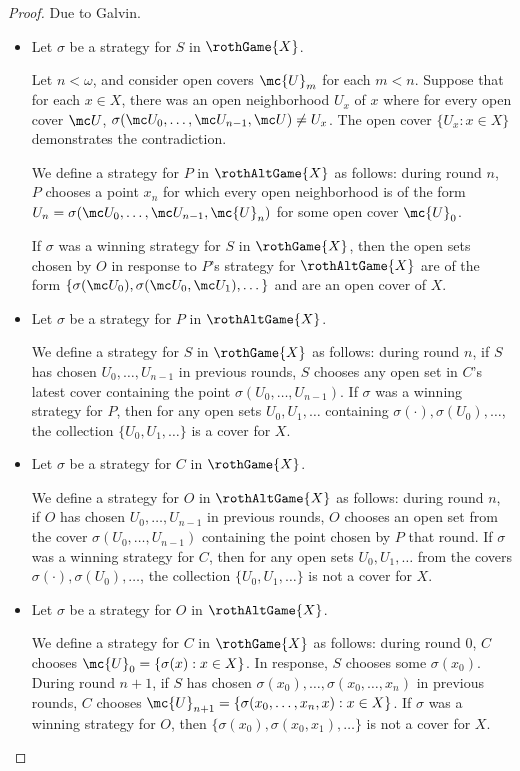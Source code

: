   \begin{proof}
    Due to Galvin.

    \begin{itemize}
      \item
      Let $\sigma$ be a strategy for $S$ in $\rothGame{X}$.

      Let $n<\omega$, and consider open covers $\mc{U}_m$ for each $m<n$. Suppose that for each $x\in X$, there was an open neighborhood $U_x$ of $x$ where for every open cover $\mc U$, $\sigma(\mc U_0,\dots,\mc U_{n-1},\mc U)\not=U_x$. The open cover $\{U_x : x\in X\}$ demonstrates the contradiction.

      We define a strategy for $P$ in $\rothAltGame{X}$ as follows: during round $n$, $P$ chooses a point $x_n$ for which every open neighborhood is of the form $U_n = \sigma(\mc U_0,\dots,\mc U_{n-1},\mc{U}_n)$ for some open cover $\mc{U}_0$.

      If $\sigma$ was a winning strategy for $S$ in $\rothGame{X}$, then the open sets chosen by $O$ in response to $P$'s strategy for $\rothAltGame{X}$ are of the form $\{\sigma(\mc U_0),\sigma(\mc U_0,\mc U_1),\dots\}$ and are an open cover of $X$.

      \item
      Let $\sigma$ be a strategy for $P$ in $\rothAltGame{X}$.

      We define a strategy for $S$ in $\rothGame{X}$ as follows: during round $n$, if $S$ has chosen $U_0,\dots,U_{n-1}$ in previous rounds, $S$ chooses any open set in $C$'s latest cover containing the point $\sigma(U_0,\dots,U_{n-1})$. If $\sigma$ was a winning strategy for $P$, then for any open sets $U_0,U_1,\dots$ containing $\sigma(\cdot),\sigma(U_0),\dots$, the collection $\{U_0,U_1,\dots\}$ is a cover for $X$.

      \item
      Let $\sigma$ be a strategy for $C$ in $\rothGame{X}$.

      We define a strategy for $O$ in $\rothAltGame{X}$ as follows: during round $n$, if $O$ has chosen $U_0,\dots,U_{n-1}$ in previous rounds, $O$ chooses an open set from the cover $\sigma(U_0,\dots,U_{n-1})$ containing the point chosen by $P$ that round. If $\sigma$ was a winning strategy for $C$, then for any open sets $U_0,U_1,\dots$ from the covers $\sigma(\cdot),\sigma(U_0),\dots$, the collection $\{U_0,U_1,\dots\}$ is not a cover for $X$.

      \item
      Let $\sigma$ be a strategy for $O$ in $\rothAltGame{X}$.

      We define a strategy for $C$ in $\rothGame{X}$ as follows: during round $0$, $C$ chooses $\mc{U}_0 = \{\sigma(x) : x\in X\}$. In response, $S$ chooses some $\sigma(x_0)$. During round $n+1$, if $S$ has chosen $\sigma(x_0),\dots,\sigma(x_0,\dots,x_n)$ in previous rounds, $C$ chooses $\mc{U}_{n+1} = \{\sigma(x_0,\dots,x_n,x) : x\in X\}$. If $\sigma$ was a winning strategy for $O$, then $\{\sigma(x_0),\sigma(x_0,x_1),\dots\}$ is not a cover for $X$.

    \end{itemize}
  \end{proof}

